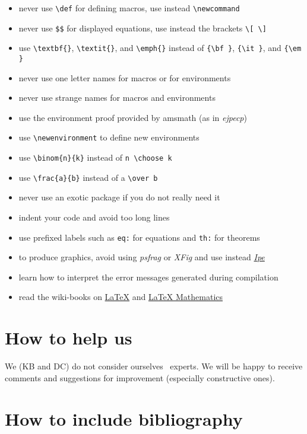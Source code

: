 \documentclass[ECP]{ejpecp} %
\begin{document}
\begin{itemize}
\item never use \verb+\def+ for defining macros, use instead
  \verb+\newcommand+
\item never use \verb+$$+ for displayed equations, use instead the brackets
  \verb+\[ \]+
\item use \verb+\textbf{}+, \verb+\textit{}+, and \verb+\emph{}+ instead of
  \verb+{\bf }+, \verb+{\it }+, and \verb+{\em }+
\item never use one letter names for macros or for environments
\item never use strange names for macros and environments
\item use the environment proof provided by amsmath (as in \emph{ejpecp})
\item use \verb+\newenvironment+ to define new environments
\item use \verb+\binom{n}{k}+ instead of \verb+n \choose k+
\item use \verb+\frac{a}{b}+ instead of a \verb+\over b+
\item never use an exotic package if you do not really need it
\item indent your code and avoid too long lines
\item use prefixed labels such as \verb+eq:+ for equations and \verb+th:+ for
  theorems
\item to produce graphics, avoid using \emph{psfrag} or \emph{XFig} and use
  instead \emph{\href{https://en.wikipedia.org/wiki/Ipe_(program)}{Ipe}}
\item learn how to interpret the error messages generated during compilation
\item read the wiki-books on \href{https://en.wikibooks.org/wiki/LaTeX}{LaTeX}
  and \href{https://en.wikibooks.org/wiki/LaTeX/Mathematics}{LaTeX Mathematics}
\end{itemize}

\section{How to help us}

We (KB and DC) do not consider ourselves \LaTeXe\ experts.
We will be happy to receive comments and suggestions for improvement
(especially constructive ones).

\section{How to include bibliography}
\end{document}
